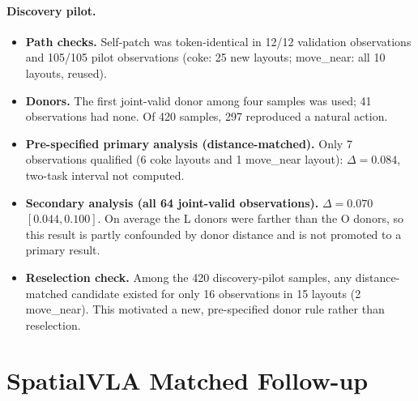 \paragraph{Discovery pilot.}
\begin{itemize}
\item \textbf{Path checks.} Self-patch was token-identical in 12/12 validation observations and 105/105 pilot observations (coke: 25 new layouts; move\_near: all 10 layouts, reused).
\item \textbf{Donors.} The first joint-valid donor among four samples was used; 41 observations had none. Of 420 samples, 297 reproduced a natural action.
\item \textbf{Pre-specified primary analysis (distance-matched).} Only 7 observations qualified (6 coke layouts and 1 move\_near layout): $\Delta=0.084$, two-task interval not computed.
\item \textbf{Secondary analysis (all 64 joint-valid observations).} $\Delta=0.070$ $[0.044,0.100]$. On average the L donors were farther than the O donors, so this result is partly confounded by donor distance and is not promoted to a primary result.
\item \textbf{Reselection check.} Among the 420 discovery-pilot samples, any distance-matched candidate existed for only 16 observations in 15 layouts (2 move\_near). This motivated a new, pre-specified donor rule rather than reselection.
\end{itemize}

\section{SpatialVLA Matched Follow-up}
\label{sec:svla2}
